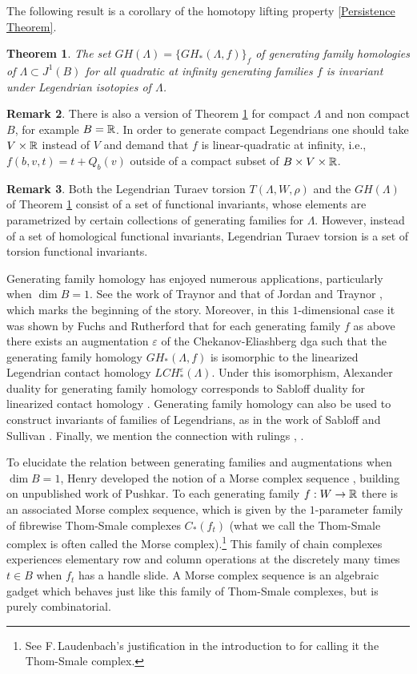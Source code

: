 \documentclass[11pt]{article}
\newcommand{\ie}{i.e.,\xspace}
\numberwithin{equation}{section}\providecommand{\dpl}{\displaystyle}
\theoremstyle{plain}
\newtheorem{theorem}{Theorem}[section]
\theoremstyle{definition}
\newtheorem{remark}[theorem]{Remark}
\let\ve\varepsilon
\begin{document}
The following result is a corollary of the homotopy lifting property \ref{Persistence Theorem}.

\begin{theorem}\label{theorem: GF}
The set $GH(\Lambda)=\{ GH_*(\Lambda, f) \}_f $ of generating family homologies of $\Lambda \subset J^1(B)$ for all quadratic at infinity generating families $f$ is invariant under Legendrian isotopies of $\Lambda$.
\end{theorem}

\begin{remark}
There is also a version of Theorem \ref{theorem: GF} for compact $\Lambda$ and non compact $B$, for example $B=\mathbb{R}$. In order to generate compact Legendrians one should take $V \times \mathbb{R}$ instead of $V$ and demand that $f$ is linear-quadratic at infinity, \ie $f(b,v,t)=t+Q_b(v)$ outside of a compact subset of $B \times V \times \mathbb{R}$.
\end{remark}

\begin{remark}
Both the Legendrian Turaev torsion $T(\Lambda, W, \rho)$ and the $GH(\Lambda)$ of Theorem \ref{theorem: GF} consist of a set of functional invariants, whose elements are parametrized by certain collections of generating families for $\Lambda$. However, instead of a set of homological functional invariants, Legendrian Turaev torsion is a set of torsion functional invariants.
\end{remark}

Generating family homology has enjoyed numerous applications, particularly when $\dim B =1$. See the work of Traynor \cite{T01} and that of Jordan and Traynor \cite{T06}, which marks the beginning of the story. Moreover, in this $1$-dimensional case it was shown by Fuchs and Rutherford \cite{FR11} that for each generating family $f$ as above there exists an augmentation $\ve$ of the Chekanov-Eliashberg dga such that the generating family homology $GH_*(\Lambda, f)$ is isomorphic to the linearized Legendrian contact homology $LCH^\ve_*(\Lambda)$. Under this isomorphism, Alexander duality for generating family homology corresponds to Sabloff duality for linearized contact homology \cite{S06}. Generating family homology can also be used to construct invariants of families of Legendrians, as in the work of Sabloff and Sullivan \cite{SS16}. Finally, we mention the connection with rulings \cite{FI04}, \cite{S05}.

To elucidate the relation between generating families and augmentations when $\dim B =1$, Henry developed the notion of a Morse complex sequence \cite{H04}, building on unpublished work of Pushkar. To each generating family $f:W \to \mathbb{R}$ there is an associated Morse complex sequence, which is given by the $1$-parameter family of fibrewise Thom-Smale complexes $C_*(f_t)$ (what we call the Thom-Smale complex is often called the Morse complex).\footnote{See F.\,Laudenbach's justification in the introduction to \cite{La11} for calling it the Thom-Smale complex.} This family of chain complexes experiences elementary row and column operations at the discretely many times $t \in B$ when $f_t$ has a handle slide. A Morse complex sequence is an algebraic gadget which behaves just like this family of Thom-Smale complexes, but is purely combinatorial.
\end{document}
